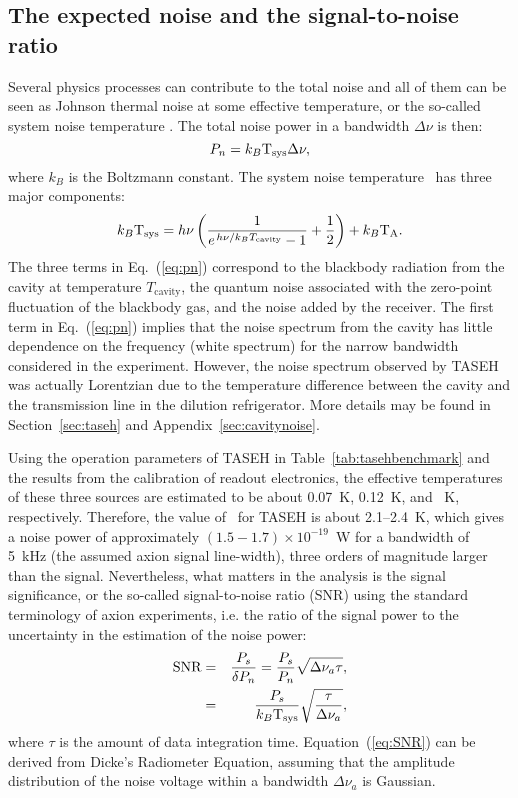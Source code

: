 \subsection{The expected noise and the signal-to-noise ratio}
\label{sec:intronoise}
Several physics processes can contribute to the total noise and all of them 
can be seen as Johnson thermal noise at some effective temperature, or the 
so-called system noise temperature \tsys. The total noise power in a 
bandwidth $\Delta\nu$ is then:
\begin{equation}
  P_n = k_B\text{T}_\text{sys}\Delta\nu, 
\end{equation}
where $k_B$ is the Boltzmann constant. 
The system noise temperature \tsys\ has three major components: 
\begin{equation}
  k_B\text{T}_\text{sys} = h\nu\left(\frac{1}{e^{\left.h\nu\right/k_{B}T_\mathrm{cavity}}-1} + \frac{1}{2} \right) + k_B\text{T}_\text{A}. 
\label{eq:pn}
\end{equation}
 The three terms in Eq.~(\ref{eq:pn}) correspond to the blackbody radiation 
from the cavity at temperature $T_\mathrm{cavity}$, the quantum noise 
associated with the zero-point fluctuation of the blackbody gas, and the noise 
added by the receiver. The first term in Eq.~(\ref{eq:pn}) implies 
that the noise spectrum from the cavity has little dependence on the frequency 
(white spectrum) for the narrow bandwidth considered in the experiment. 
However, the noise spectrum observed by TASEH 
was actually Lorentzian due to the temperature difference between the cavity 
and the transmission line in the dilution refrigerator. More details may be 
found in Section~\ref{sec:taseh} and Appendix~\ref{sec:cavitynoise}. 

Using the operation parameters of TASEH in Table~\ref{tab:tasehbenchmark} and 
the results from the calibration of readout electronics, 
the effective temperatures of these three sources are estimated to be about 
0.07~K, 0.12~K, and \noise~K, respectively.  
Therefore, the value of \tsys\ for TASEH 
is about 2.1--2.4~K, which gives a noise power of approximately 
$\left(1.5-1.7\right)\times 10^{-19}$~W 
for a bandwidth of 5~kHz (the assumed axion signal line-width), three 
orders of magnitude larger than the signal. Nevertheless, what matters in the 
analysis is the signal significance, or the so-called signal-to-noise ratio 
(SNR) using the standard terminology of axion experiments, i.e. the ratio of 
the signal power to the uncertainty in the estimation of 
the noise power:
\begin{eqnarray}
   \text{SNR} & = & \frac{P_s}{\delta P_n} = \frac{P_s}{P_n}\sqrt{\Delta\nu_a\tau}, \nonumber \\
              & = & \frac{P_s}{k_B\text{T}_\text{sys}}\sqrt{\frac{\tau}{\Delta\nu_a}},
 \label{eq:SNR}
\end{eqnarray}  
where $\tau$ is the amount of data integration time. Equation~(\ref{eq:SNR}) 
can be derived from Dicke's Radiometer Equation, assuming that the amplitude 
distribution of the noise voltage within a bandwidth $\Delta\nu_a$ is Gaussian.










